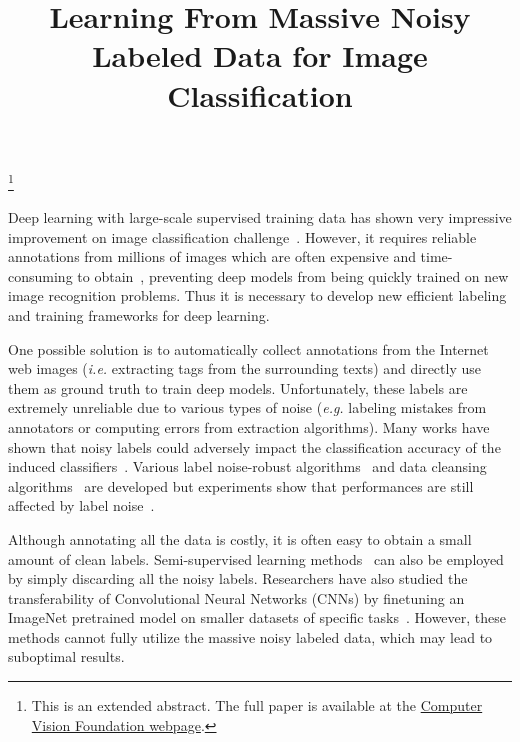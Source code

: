 \documentclass[extendedabs]{bmvc2k}
\begin{document}
\title{Learning From Massive Noisy Labeled Data for Image Classification}

\maketitle
\let\thefootnote\relax\footnote{This is an extended abstract. The full paper is available at the \href{http://www.cv-foundation.org/openaccess/CVPR2015.py}{Computer Vision Foundation webpage}. }
\vspace{-0.2in}

\noindent
Deep learning with large-scale supervised training data has shown very impressive improvement on image classification challenge~\cite{krizhevsky2012imagenet}. However, it requires reliable annotations from millions of images which are often expensive and time-consuming to obtain~\cite{deng2009imagenet}, preventing deep models from being quickly trained on new image recognition problems. Thus it is necessary to develop new efficient labeling and training frameworks for deep learning.

One possible solution is to automatically collect annotations from the Internet web images (\emph{i.e.} extracting tags from the surrounding texts) and directly use them as ground truth to train deep models. Unfortunately, these labels are extremely unreliable due to various types of noise (\emph{e.g.} labeling mistakes from annotators or computing errors from extraction algorithms). Many works have shown that noisy labels could adversely impact the classification accuracy of the induced classifiers~\cite{nettleton2010study}. Various label noise-robust algorithms~\cite{manwani2013noise} and data cleansing algorithms~\cite{brodley2011identifying} are developed but experiments show that performances are still affected by label noise~\cite{bartlett2006convexity}.

Although annotating all the data is costly, it is often easy to obtain a small amount of clean labels. Semi-supervised learning methods~\cite{lee2013pseudo} can also be employed by simply discarding all the noisy labels. Researchers have also studied the transferability of Convolutional Neural Networks (CNNs) by finetuning an ImageNet pretrained model on smaller datasets of specific tasks~\cite{oquab2014learning}. However, these methods cannot fully utilize the massive noisy labeled data, which may lead to suboptimal results.
\end{document}
